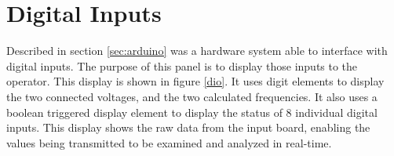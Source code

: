 

\section{Digital Inputs}
\label{sec:diopanel}
Described in section \ref{sec:arduino} was a hardware system able to interface with digital inputs. The purpose of this panel is to display those inputs to the operator. This display is shown in figure \ref{dio}. It uses digit elements to display the two connected voltages, and the two calculated frequencies. It also uses a boolean triggered display element to display the status of 8 individual digital inputs. This display shows the raw data from the input board, enabling the values being transmitted to be examined and analyzed in real-time.



